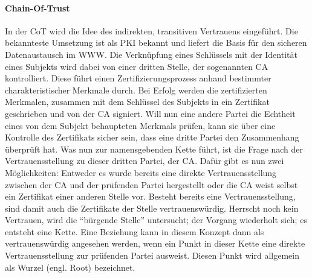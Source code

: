 \paragraph{Chain-Of-Trust}
In der \ac{CoT} wird die Idee des indirekten, transitiven Vertrauens eingeführt. Die bekannteste Umsetzung ist als \ac{PKI} bekannt und liefert die Basis für den sicheren Datenaustausch im \ac{WWW}. Die Verknüpfung eines Schlüssels mit der Identität eines Subjekts wird dabei von einer dritten Stelle, der sogenannten \ac{CA} kontrolliert. Diese führt einen Zertifizierungsprozess  anhand bestimmter charakteristischer Merkmale durch. Bei Erfolg werden die zertifizierten Merkmalen, zusammen mit dem Schlüssel des Subjekts in ein Zertifikat geschrieben und von der \ac{CA} signiert. Will nun eine andere Partei die Echtheit eines von dem Subjekt behaupteten Merkmals prüfen, kann sie über eine Kontrolle des Zertifikats sicher sein, dass eine dritte Partei den Zusammenhang überprüft hat. Was nun zur namensgebenden Kette führt, ist die Frage nach der Vertrauensstellung zu dieser dritten Partei, der \ac{CA}. Dafür gibt es nun zwei Möglichkeiten: Entweder es wurde bereits eine direkte Vertrauensstellung zwischen der \ac{CA} und der prüfenden Partei hergestellt oder die \ac{CA} weist selbst ein Zertifikat einer anderen Stelle vor. Besteht bereits eine Vertrauensstellung, sind damit auch die Zertifikate der Stelle vertrauenswürdig. Herrscht noch kein Vertrauen, wird die ``bürgende Stelle'' untersucht; der Vorgang wiederholt sich; es entsteht eine Kette. Eine Beziehung kann in diesem Konzept dann als vertrauenswürdig angesehen werden, wenn ein Punkt in dieser Kette eine direkte Vertrauensstellung zur prüfenden Partei ausweist. Diesen Punkt wird allgemein als Wurzel (engl. Root) bezeichnet\cite[p. 423 ff.]{Eckert2013}.  
